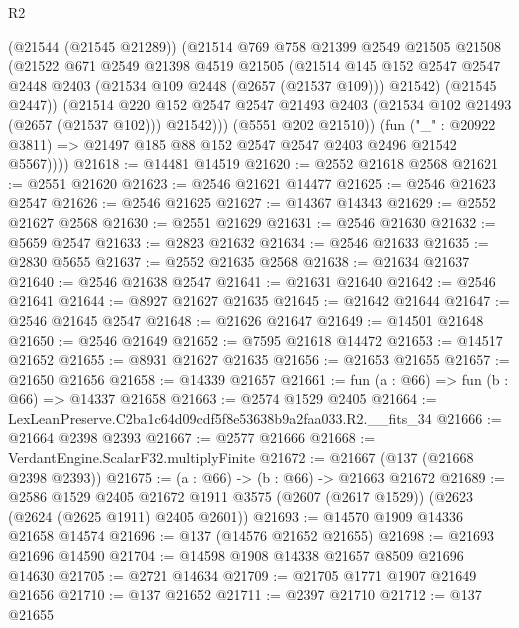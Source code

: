 \begin{lexlean}{R2}
\begin{coremodule}
              (@21544 (@21545 @21289))
              (@21514
                @769
                @758
                @21399
                @2549
                @21505
                @21508
                (@21522
                  @671
                  @2549
                  @21398
                  @4519
                  @21505
                  (@21514
                    @145
                    @152
                    @2547
                    @2547
                    @2448
                    @2403
                    (@21534 @109 @2448 (@2657 (@21537 @109)))
                    @21542)
                  (@21545 @2447))
                (@21514
                  @220
                  @152
                  @2547
                  @2547
                  @21493
                  @2403
                  (@21534 @102 @21493 (@2657 (@21537 @102)))
                  @21542)))
            (@5551 @202 @21510))
          (fun ("_" : @20922 @3811) => @21497 @185 @88 @152 @2547 @2547 @2403 @2496 @21542 @5567))))
@21618 := @14481 @14519
@21620 := @2552 @21618 @2568
@21621 := @2551 @21620
@21623 := @2546 @21621 @14477
@21625 := @2546 @21623 @2547
@21626 := @2546 @21625
@21627 := @14367 @14343
@21629 := @2552 @21627 @2568
@21630 := @2551 @21629
@21631 := @2546 @21630
@21632 := @5659 @2547
@21633 := @2823 @21632
@21634 := @2546 @21633
@21635 := @2830 @5655
@21637 := @2552 @21635 @2568
@21638 := @21634 @21637
@21640 := @2546 @21638 @2547
@21641 := @21631 @21640
@21642 := @2546 @21641
@21644 := @8927 @21627 @21635
@21645 := @21642 @21644
@21647 := @2546 @21645 @2547
@21648 := @21626 @21647
@21649 := @14501 @21648
@21650 := @2546 @21649
@21652 := @7595 @21618 @14472
@21653 := @14517 @21652
@21655 := @8931 @21627 @21635
@21656 := @21653 @21655
@21657 := @21650 @21656
@21658 := @14339 @21657
@21661 := fun (a : @66) => fun (b : @66) => @14337 @21658
@21663 := @2574 @1529 @2405
@21664 := LexLeanPreserve.C2ba1c64d09cdf5f8e53638b9a2faa033.R2.__fits_34
@21666 := @21664 @2398 @2393
@21667 := @2577 @21666
@21668 := VerdantEngine.ScalarF32.multiplyFinite
@21672 := @21667 (@137 (@21668 @2398 @2393))
@21675 := (a : @66) -> (b : @66) -> @21663 @21672
@21689 := @2586
    @1529
    @2405
    @21672
    @1911
    @3575
    (@2607 (@2617 @1529))
    (@2623 (@2624 (@2625 @1911) @2405 @2601))
@21693 := @14570 @1909 @14336 @21658 @14574
@21696 := @137 (@14576 @21652 @21655)
@21698 := @21693 @21696 @14590
@21704 := @14598 @1908 @14338 @21657 @8509 @21696 @14630
@21705 := @2721 @14634
@21709 := @21705 @1771 @1907 @21649 @21656
@21710 := @137 @21652
@21711 := @2397 @21710
@21712 := @137 @21655

\end{coremodule}
\end{lexlean}
